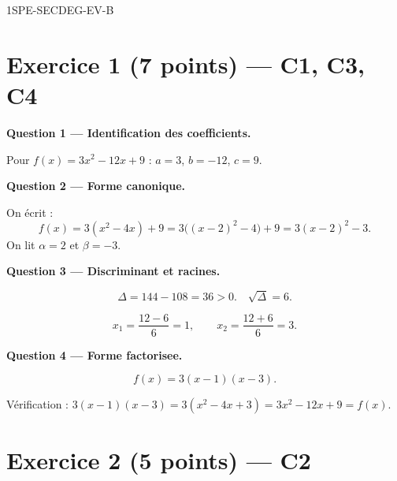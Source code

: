 \begin{corrige}{1SPE-SECDEG-EV-B}

\section*{Exercice 1 \hfill (7 points) — C1, C3, C4}


\bigskip
\textbf{Question 1 — Identification des coefficients.}


Pour $f(x) = 3x^2 - 12x + 9$ : $a = 3$, $b = -12$, $c = 9$.

\medskip
\textbf{Question 2 — Forme canonique.}


On écrit :
\[
f(x)=3(x^2-4x)+9
=3\bigl((x-2)^2-4\bigr)+9=3(x-2)^2-3.
\]
On lit $\alpha=2$ et $\beta=-3$.

\medskip
\textbf{Question 3 — Discriminant et racines.}


\[
\Delta = 144 - 108 = 36 > 0. \quad \sqrt{\Delta} = 6.
\]

\[
x_1 = \frac{12 - 6}{6} = 1, \qquad x_2 = \frac{12 + 6}{6} = 3.
\]

\medskip
\textbf{Question 4 — Forme factorisee.}


\[
\boxed{f(x) = 3(x-1)(x-3).}
\]

Vérification : $3(x-1)(x-3) = 3(x^2 - 4x + 3) = 3x^2 - 12x + 9 = f(x)$. \checkmark

\section*{Exercice 2 \hfill (5 points) — C2}



\end{corrige}
